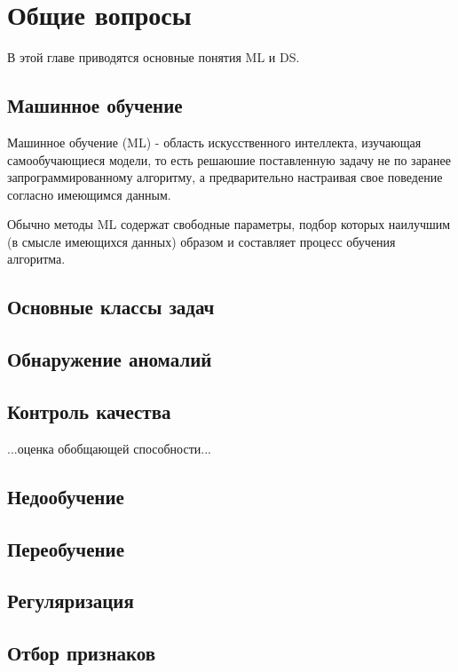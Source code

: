 \chapter{Общие вопросы}

В этой главе приводятся основные понятия ML и DS. 


\section{Машинное обучение}

Машинное обучение (ML) - область искусственного интеллекта, изучающая самообучающиеся модели, то есть решаюшие поставленную задачу не по заранее запрограммированному алгоритму, а предварительно настраивая свое поведение согласно имеющимся данным. 

Обычно методы ML содержат свободные параметры, подбор которых наилучшим (в смысле имеющихся данных) образом и составляет процесс обучения алгоритма.


\section{Основные классы задач}


\section{Обнаружение аномалий}


\section{Контроль качества}

...оценка обобщающей способности...


\section{Недообучение}


\section{Переобучение}


\section{Регуляризация}


\section{Отбор признаков}


